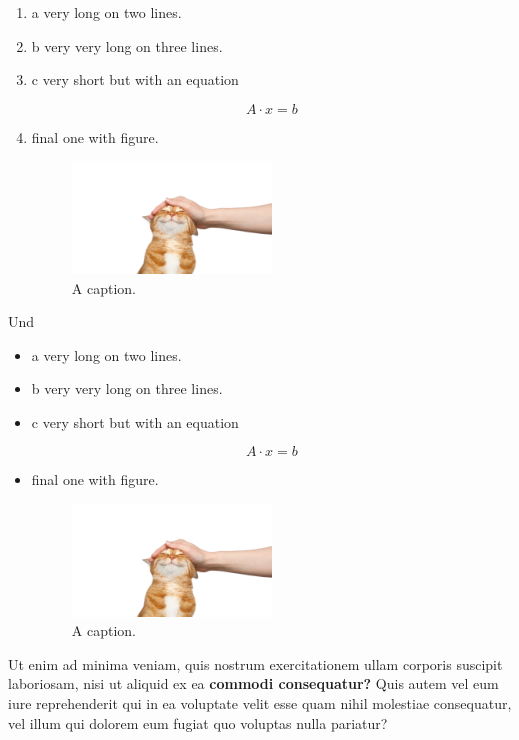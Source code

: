 \begin{enumerate}
\item a very long 
on two lines.

\item b very very long 
 on three
 lines.

\item c very short but 
 with an equation 

\begin{equation}
A \cdot x = b
\label{eq:eqinItem1}
\end{equation}

\item final one with figure.

\begin{figure}
\centering
\includegraphics[width=0.5\textwidth]{cat.png}
\caption{A caption.}
\end{figure}

\end{enumerate}

Und 

\begin{itemize}
\item a very long 
on two lines.

\item b very very long 
 on three
 lines.

\item c very short but 
 with an equation 

\begin{equation}
A \cdot x = b
\label{eq:eqinItem2}
\end{equation}

\item final one with figure.

\begin{figure}
\centering
\includegraphics[width=0.5\textwidth]{cat.png}
\caption{A caption.}
\end{figure}

\end{itemize}

Ut enim ad minima veniam, quis nostrum exercitationem ullam corporis suscipit laboriosam, nisi ut aliquid ex ea \textbf{commodi consequatur?} Quis autem vel eum iure reprehenderit qui in ea voluptate velit esse quam nihil molestiae consequatur, vel illum qui dolorem eum fugiat quo voluptas nulla pariatur?
